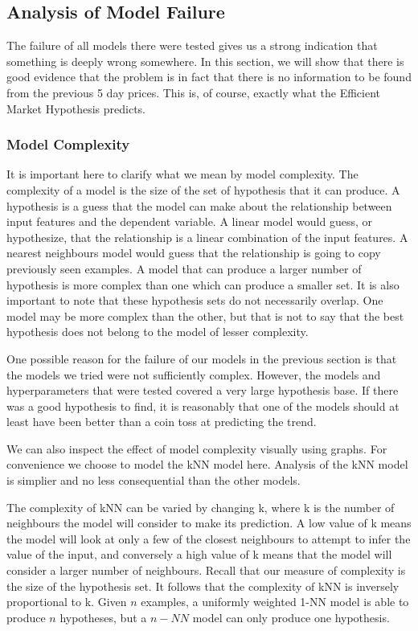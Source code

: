 \documentclass{report}
\begin{document}
\subsection{Analysis of Model Failure}


The failure of all models there were tested gives us a strong indication that something is deeply wrong somewhere. In this section, we will show that there is good evidence that the problem is in fact that there is no information to be found from the previous 5 day prices. This is, of course, exactly what the Efficient Market Hypothesis predicts.

\subsubsection{Model Complexity}

It is important here to clarify what we mean by model complexity. The complexity of a model is the size of the set of hypothesis that it can produce. A hypothesis is a guess that the model can make about the relationship between input features and the dependent variable. A linear model would guess, or hypothesize, that the relationship is a linear combination of the input features. A nearest neighbours model would guess that the relationship is going to copy previously seen examples. A model that can produce a larger number of hypothesis is more complex than one which can produce a smaller set. It is also important to note that these hypothesis sets do not necessarily overlap. One model may be more complex than the other, but that is not to say that the best hypothesis does not belong to the model of lesser complexity.

One possible reason for the failure of our models in the previous section is that the models we tried were not sufficiently complex. However, the models and hyperparameters that were tested covered a very large hypothesis base. If there was a good hypothesis to find, it is reasonably that one of the models should at least have been better than a coin toss at predicting the trend. 

We can also inspect the effect of model complexity visually using graphs. For convenience we choose to model the kNN model here. Analysis of the kNN model is simplier and no less consequential than the other models.

The complexity of kNN can be varied by changing k, where k is the number of neighbours the model will consider to make its prediction. A low value of k means the model will look at only a few of the closest neighbours to attempt to infer the value of the input, and conversely a high value of k means that the model will consider a larger number of neighbours. Recall that our measure of complexity is the size of the hypothesis set. It follows that the complexity of kNN is inversely proportional to k. Given $n$ examples, a uniformly weighted 1-NN model is able to produce $n$ hypotheses, but a $n-NN$ model can only produce one hypothesis.
\end{document}

